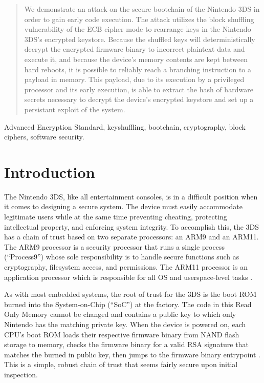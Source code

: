 \documentclass[journal]{IEEEtran}
\begin{document}
\begin{abstract}
We demonstrate an attack on the secure bootchain of the Nintendo 3DS in order to
gain early code execution. The attack utilizes the block shuffling vulnerability
of the ECB cipher mode to rearrange keys in the Nintendo 3DS's encrypted
keystore. Because the shuffled keys will deterministically decrypt the encrypted
firmware binary to incorrect plaintext data and execute it, and because the
device's memory contents are kept between hard reboots, it is possible to
reliably reach a branching instruction to a payload in memory. This payload, due
to its execution by a privileged processor and its early execution, is able to
extract the hash of hardware secrets necessary to decrypt the device's encrypted
keystore and set up a persistant exploit of the system.
\end{abstract}

\begin{IEEEkeywords}
Advanced Encryption Standard, keyshuffling, bootchain, cryptography, block
ciphers, software security.
\end{IEEEkeywords}

\section{Introduction}

The Nintendo 3DS, like all entertainment consoles, is in a difficult position
when it comes to designing a secure system. The device must easily accommodate
legitimate users while at the same time preventing cheating, protecting
intellectual property, and enforcing system integrity. To accomplish this, the
3DS has a chain of trust based on two separate processors: an ARM9 and an ARM11.
The ARM9 processor is a security processor that runs a single process
(``Process9'') whose sole responsibility is to handle secure functions such as
cryptography, filesystem access, and permissions. The ARM11 processor is an
application processor which is responsible for all OS and userspace-level
tasks \cite{cryptosystem}.

As with most embedded systems, the root of trust for the 3DS is the boot ROM
burned into the System-on-Chip (``SoC'') at the factory. The code in this Read
Only Memory cannot be changed and contains a public key to which only Nintendo
has the matching private key. When the device is powered on, each CPU's boot ROM
loads their respective firmware binary from NAND flash storage to memory, checks
the firmware binary for a valid RSA signature that matches the burned in public
key, then jumps to the firmware binary entrypoint \cite{cryptosystem}. This is a
simple, robust chain of trust that seems fairly secure upon initial inspection.
\end{document}
